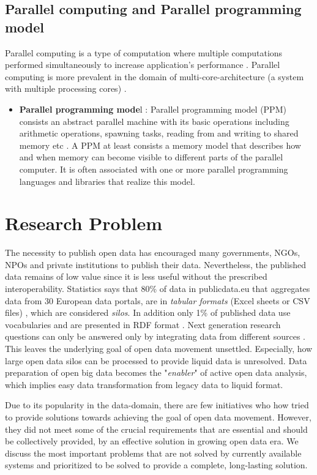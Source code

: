 \subsection{Parallel computing and Parallel programming model}
Parallel computing is a type of computation where multiple computations performed simultaneously to increase application's performance \cite{parallelprg} . Parallel computing is more prevalent in the domain of multi-core-architecture (a system with multiple processing cores) . 
\begin{itemize}
\item \textbf{Parallel programming mode}l : Parallel programming model (PPM) consists an abstract parallel machine with its basic operations including arithmetic operations, spawning tasks, reading from and writing to shared memory etc \cite{PPM}. A PPM at least consists a memory model that describes how and when memory can become visible to different parts of the parallel computer. It is often associated with one or more parallel programming languages and libraries that realize this model.
\end{itemize}

\section{Research Problem}
\label{sec:problem}
 \noindent The necessity to publish open data has encouraged many governments, NGOs, NPOs and private institutions to publish their data. Nevertheless, the published data remains of low value since it is less useful without the prescribed interoperability. Statistics says that 80\% of data in publicdata.eu that aggregates data from 30 European data portals, are in\textit{ tabular formats} (Excel sheets or CSV files) \cite{nemreport}, which are considered \textit{silos}. In addition only 1\% of published data use vocabularies and are presented in RDF format \cite{nemreport}. Next generation research questions can only be answered only by integrating data from different sources \cite{nemreport}. This leaves the underlying goal of open data movement unsettled. Especially, how large open data silos can be processed to provide liquid data is unresolved. Data preparation of open big data  becomes the "\textit{enabler}" of active open data analysis, which implies easy data transformation from legacy data to liquid format. 

Due to its popularity in the data-domain, there are few initiatives who how tried to provide solutions towards achieving the goal of open data movement. However, they did not meet some of the crucial requirements that are essential and should be collectively provided, by an effective solution in growing open data era. We discuss the most important problems that are not solved by currently available systems and prioritized to be solved to provide a complete, long-lasting solution. 

